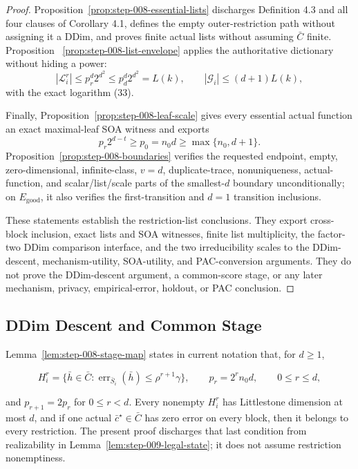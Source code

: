 \begin{proof}
Proposition~\ref{prop:step-008-essential-lists} discharges Definition 4.3
and all four clauses of Corollary 4.1, defines the empty outer-restriction
path without assigning it a DDim, and proves finite actual lists without
assuming \(\bar C\) finite. Proposition
~\ref{prop:step-008-list-envelope} applies the authoritative dictionary
without hiding a power:
\[
 |\mathcal L_i^r|\le p_r^d2^{d^2}
 \le p_d^d2^{d^2}=L(k),
 \qquad
 |\mathcal G_i|\le(d+1)L(k),
\]
with the exact logarithm (33).

Finally, Proposition~\ref{prop:step-008-leaf-scale} gives every essential
actual function an exact maximal-leaf SOA witness and exports
\[
 p_r2^{d-t}\ge p_0=n_0d\ge\max\{n_0,d+1\}.
\]
Proposition~\ref{prop:step-008-boundaries} verifies the requested endpoint,
empty, zero-dimensional, infinite-class, \(v=d\), duplicate-trace,
nonuniqueness, actual-function, and scalar/list/scale parts of the
smallest-\(d\) boundary unconditionally; on \(E_{\mathrm{good}}\), it also
verifies the first-transition and \(d=1\) transition inclusions.

These statements establish the restriction-list conclusions. They export
cross-block inclusion, exact lists and SOA witnesses, finite list
multiplicity, the factor-two DDim comparison interface, and the two
irreducibility scales to the DDim-descent, mechanism-utility, SOA-utility,
and PAC-conversion arguments. They
do not prove the DDim-descent argument, a common-score stage, or any later
mechanism, privacy, empirical-error, holdout, or PAC conclusion.



\end{proof}

\subsection{DDim Descent and Common Stage}\label{app:step_009}


Lemma~\ref{lem:step-008-stage-map} states in current notation that,
for \(d\ge1\),

\[
 H_i^r
 =\{\bar h\in\bar C:
       \operatorname{err}_{\bar S_i}(\bar h)
       \leq\rho^{r+1}\gamma\},
 \qquad
 p_r=2^rn_0d,
 \qquad 0\le r\le d,
 \tag{5}
\]

and \(p_{r+1}=2p_r\) for \(0\le r<d\). Every nonempty \(H_i^r\) has
Littlestone dimension at most \(d\), and if one actual
\(\bar c^\star\in\bar C\) has zero error on every block, then it belongs to
every restriction. The present proof discharges that last condition from
realizability in Lemma~\ref{lem:step-009-legal-state}; it does not assume
restriction nonemptiness.

